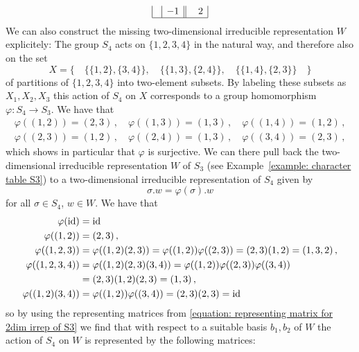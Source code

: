 \begin{example}
\[\begin{array}{|c|c||c|c|c|c|c|}
      &           -1
      & \phantom{-}2
      \\
      \hline
    \end{array}
  \]
  We can also construct the missing two-dimensional irreducible representation $W$ explicitely:
  The group $S_4$ acts on $\{1,2,3,4\}$ in the natural way, and therefore also on the set
  \[
      X
    = \big\{
        \quad
        \{\{1,2\},\{3,4\}\},
        \quad
        \{\{1,3\},\{2,4\}\},
        \quad
        \{\{1,4\},\{2,3\}\}
        \quad
      \big\}
  \]
  of partitions of $\{1,2,3,4\}$ into two-element subsets.
  By labeling these subsets as $X_1, X_2, X_3$ this action of $S_4$ on $X$ corresponds to a group homomorphism $\varphi \colon S_4 \to S_3$.
  We have that
  \begin{gather*}
      \varphi( (1,2) )
    = (2,3) \,,
    \quad
      \varphi( (1,3) )
    = (1,3) \,,
    \quad
      \varphi( (1,4) )
    = (1,2) \,,
    \\
      \varphi( (2,3) )
    = (1,2) \,,
    \quad
      \varphi( (2,4) )
    = (1,3) \,,
    \quad
      \varphi( (3,4) )
    = (2,3) \,,
  \end{gather*}
  which shows in particular that $\varphi$ is surjective.
  We can there pull back the two-dimensional irreducible representation $W$ of $S_3$ (see Example~\ref{example: character table S3}) to a two-di\-men\-sion\-al irreducible representation of $S_4$ given by
  \[
      \sigma . w
    = \varphi(\sigma) . w
  \]
  for all $\sigma \in S_4$, $w \in W$.
  We have that
  \begin{align*}
        \varphi(\operatorname{id})
    &=  \operatorname{id}
    \\
        \varphi( (1,2) )
    &=  (2,3) \,,
    \\
        \varphi( (1,2,3) )
    &=  \varphi( (1,2) (2,3) )
     =  \varphi( (1,2) ) \varphi( (2,3) )
     =  (2,3) (1,2)
     =  (1,3,2) \,,
    \\
        \varphi( (1,2,3,4) )
    &=  \varphi( (1,2) (2,3) (3,4) )
     =  \varphi( (1,2) ) \varphi( (2,3) ) \varphi( (3,4) )  \\
    &=  (2,3) (1,2) (2,3)
     =  (1,3) \,,
    \\
        \varphi( (1,2) (3,4) )
    &=  \varphi( (1,2) ) \varphi( (3,4) )
     =  (2,3) (2,3)
     =  \operatorname{id}
  \end{align*}
  so by using the representing matrices from \eqref{equation: representing matrix for 2dim irrep of S3} we find that with respect to a suitable basis $b_1, b_2$ of $W$ the action of $S_4$ on $W$ is represented by the following matrices:

\end{example}

